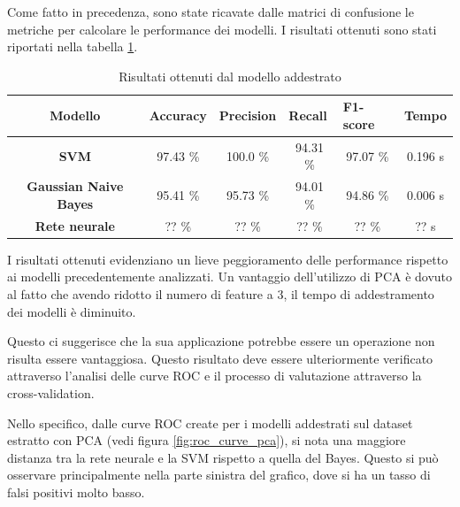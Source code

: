 Come fatto in precedenza, sono state ricavate dalle matrici di confusione le
metriche per calcolare le performance dei modelli. I risultati ottenuti sono stati
riportati nella tabella \ref{tab:risultati_pca}.
\begin{table}[!ht]
    \centering
    \begin{tabular}{@{}clllll@{}}
        \toprule
        \rowcolor[HTML]{EFEFEF}
        \textbf{Modello}                                      & \textbf{Accuracy}            & \textbf{Precision}           & \textbf{Recall}              & \textbf{F1-score}            & \textbf{Tempo}              \\ \midrule
        \cellcolor[HTML]{EFEFEF}\textbf{SVM}                  & \multicolumn{1}{c}{97.43 \%} & \multicolumn{1}{c}{100.0 \%} & \multicolumn{1}{c}{94.31 \%} & \multicolumn{1}{c}{97.07 \%} & \multicolumn{1}{c}{0.196 s} \\
        \cellcolor[HTML]{EFEFEF}\textbf{Gaussian Naive Bayes} & \multicolumn{1}{c}{95.41 \%} & \multicolumn{1}{c}{95.73 \%} & \multicolumn{1}{c}{94.01 \%} & \multicolumn{1}{c}{94.86 \%} & \multicolumn{1}{c}{0.006 s} \\
        \cellcolor[HTML]{EFEFEF}\textbf{Rete neurale}         & \multicolumn{1}{c}{?? \%}    & \multicolumn{1}{c}{?? \%}    & \multicolumn{1}{c}{?? \%}    & \multicolumn{1}{c}{?? \%}    & \multicolumn{1}{c}{?? s}    \\ \bottomrule
    \end{tabular}
    \caption{Risultati ottenuti dal modello addestrato}
    \label{tab:risultati_pca}
\end{table}

I risultati ottenuti evidenziano un lieve peggioramento delle performance
rispetto ai modelli precedentemente analizzati. Un vantaggio dell'utilizzo di
PCA è dovuto al fatto che avendo ridotto il numero di feature a $3$, il tempo di
addestramento dei modelli è diminuito.

Questo ci suggerisce che la sua applicazione potrebbe essere un operazione
non risulta essere vantaggiosa. Questo risultato deve essere ulteriormente
verificato attraverso l'analisi delle curve ROC e il processo di valutazione
attraverso la cross-validation.

Nello specifico, dalle curve ROC create per i modelli addestrati sul dataset
estratto con PCA (vedi figura \ref{fig:roc_curve_pca}), si nota una maggiore
distanza tra la rete neurale e la SVM rispetto a quella del Bayes.
Questo si può osservare principalmente nella parte sinistra del grafico, dove si
ha un tasso di falsi positivi molto basso.

